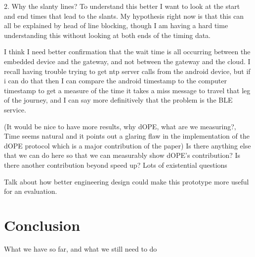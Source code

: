 \documentclass[12pt]{article}
\begin{document}
2. Why the slanty lines?  To understand this better I want to look at the start and end times that lead to the slants.  My hypothesis right now is that this can all be explained by head of line blocking, though I am having a hard time understanding this without looking at both ends of the timing data.

I think I need better confirmation that the wait time is all occurring between the embedded device and the gateway, and not between the gateway and the cloud.  I recall having trouble trying to get ntp server calls from the android device, but if i can do that then I can compare the android timestamp to the computer timestamp to get a measure of the time it takes a miss message to travel that leg of the journey, and I can say more definitively that the problem is the BLE service.

(It would be nice to have more results, why dOPE, what are we measuring?, Time seems natural and it points out a glaring flaw in the implementation of the dOPE protocol which is a major contribution of the paper)  Is there anything else that we can do here so that we can measurably show dOPE's contribution?  Is there another contribution beyond speed up?  Lots of existential questions 

Talk about how better engineering design could make this prototype more useful for an evaluation.



\section{Conclusion}
What we have so far, and 
what we still need to do
\end{document}
